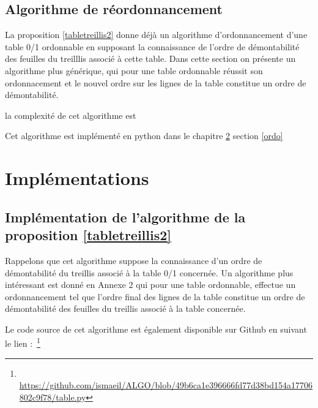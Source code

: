 \documentclass[a4paper]{report}
\newcommand{\lien}[1]{$\,$\footnote{$\,$\url{#1}}}
\begin{document}
\section{Algorithme de réordonnancement}
 
La proposition \ref{tabletreillis2} donne déjà un algorithme d'ordonnancement d'une table 0/1 ordonnable en supposant la connaissance de l'ordre de démontabilité
 des feuilles du treilllis associé à cette table. Dans cette section on présente un algorithme plus générique, qui pour une table ordonnable réussit son ordonnacement et 
le nouvel ordre sur les lignes de la table constitue un ordre de démontabilité.

la complexité de cet algorithme est

Cet algorithme est implémenté en python dans le chapitre \ref{implement} section \ref{ordo}

\chapter{Implémentations}
\label{implement}

\section{Implémentation de l'algorithme de la proposition \ref{tabletreillis2}}
\label{algov0}

Rappelons que cet algorithme suppose la connaissance d'un ordre de démont\-abilité du treillis associé à la table 0/1 concernée.
Un algorithme plus intéressant est donné en Annexe 2 qui pour une table ordonnable, effectue un ordonnancement tel que l'ordre final des lignes
 de la table constitue un ordre de démontabilité des feuilles du treillis associé à la table concernée.

Le code source de cet algorithme est également disponible sur Github en suivant le lien : 
\lien{https://github.com/ismaeil/ALGO/blob/49b6ca1e396666fd77d38bd154a17706802c9f78/table.py}

   
\end{document}

